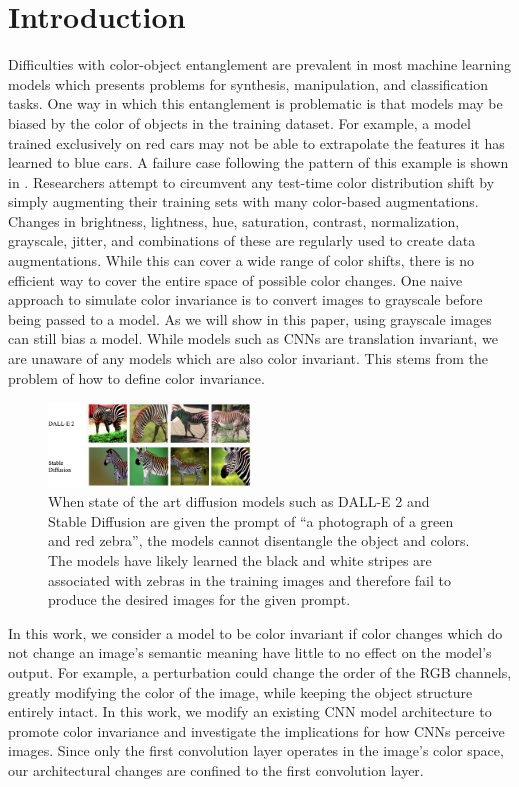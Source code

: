 \documentclass[10pt,twocolumn,letterpaper]{article}
\begin{document}
\section{Introduction}
\label{intro}
Difficulties with color-object entanglement are prevalent in most machine learning models which presents problems for synthesis, manipulation, and classification tasks. One way in which this entanglement is problematic is that models may be biased by the color of objects in the training dataset. For example, a model trained exclusively on red cars may not be able to extrapolate the features it has learned to blue cars. A failure case following the pattern of this example is shown in . Researchers attempt to circumvent any test-time color distribution shift by simply augmenting their training sets with many color-based augmentations. Changes in brightness, lightness, hue, saturation, contrast, normalization, grayscale, jitter, and combinations of these are regularly used to create data augmentations. While this can cover a wide range of color shifts, there is no efficient way to cover the entire space of possible color changes. One naive approach to simulate color invariance is to convert images to grayscale before being passed to a model. As we will show in this paper, using grayscale images can still bias a model. While models such as CNNs are translation invariant, we are unaware of any models which are also color invariant. This stems from the problem of how to define color invariance.

\begin{figure}[h!]
    \centering
    \includegraphics[width=0.48\textwidth]{images/zebras.png}
    \caption{When state of the art diffusion models such as DALL-E 2 and Stable Diffusion are given the prompt of “a photograph of a green and red zebra”, the models cannot disentangle the object and colors. The models have likely learned the black and white stripes are associated with zebras in the training images and therefore fail to produce the desired images for the given prompt.}
    \label{zebras}
\end{figure}

In this work, we consider a model to be color invariant if color changes which do not change an image's semantic meaning have little to no effect on the model's output. For example, a perturbation could change the order of the RGB channels, greatly modifying the color of the image, while keeping the object structure entirely intact. In this work, we modify an existing CNN model architecture to promote color invariance and investigate the implications for how CNNs perceive images. Since only the first convolution layer operates in the image's color space, our architectural changes are confined to the first convolution layer.
\end{document}
